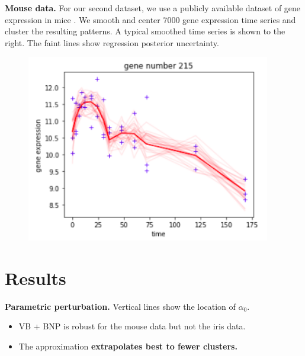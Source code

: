 \documentclass[a0,plainsections,30pt]{sciposter}\usepackage[]{graphicx}\usepackage[]{color}
\newenvironment{knitrout}{}{} %
\begin{document}
\begin{minipage}[t]{0.45\textwidth}
\begin{minipage}[t]{0.49\textwidth}
\begin{knitrout}
{}



\end{knitrout}
\end{minipage}
%

\vspace{1em}

\begin{minipage}[t]{0.49\textwidth}
%
\textbf{Mouse data.} For our second dataset, we use a publicly available
dataset of gene expression in mice \citep{shoemaker:2015:ultrasensitive}. We
smooth and center 7000 gene expression time series and cluster the resulting
patterns.  A typical smoothed time series is shown to the right.  The faint
lines show regression posterior uncertainty.
%
\end{minipage}
%
\begin{minipage}[t]{0.49\textwidth}
\vspace{-0.8in}
\begin{figure}[!h]
\centering
\includegraphics[width = 0.95\textwidth]{./static_images/mouse_genes.png}
\end{figure}
\end{minipage}
%

\vspace{-0.6in}
\section*{Results}
\vspace{-0.3in}

\textbf{Parametric perturbation.} Vertical lines show the location of
$\alpha_0$.
\begin{itemize}
\item VB + BNP is robust for the mouse data but not the iris data.
\item The approximation \textbf{extrapolates best to fewer clusters.}
\end{itemize}


\end{minipage}
\end{document}
